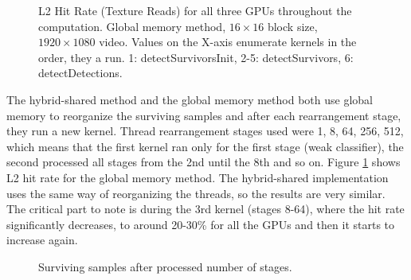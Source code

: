 \begin{figure}[h]
\centering{}
	\caption{L2 Hit Rate (Texture Reads) for all three GPUs throughout the computation. Global memory method, $16 \times 16$ block size, $1920 \times 1080$ video. Values on the X-axis enumerate kernels in the order, they a run. 1: detectSurvivorsInit, 2-5: detectSurvivors, 6: detectDetections.}
	\label{fig:l2-hit-rate-global}
\end{figure}

The hybrid-shared method and the global memory method both use global memory to reorganize the surviving samples and after each rearrangement stage, they run a new kernel. Thread rearrangement stages used were 1, 8, 64, 256, 512, which means that the first kernel ran only for the first stage (weak classifier), the second processed all stages from the 2nd until the 8th and so on. Figure \ref{fig:l2-hit-rate-global} shows L2 hit rate for the global memory method. The hybrid-shared implementation uses the same way of reorganizing the threads, so the results are very similar. The critical part to note is during the 3rd kernel (stages 8-64), where the hit rate significantly decreases, to around 20-30\% for all the GPUs and then it starts to increase again.

\begin{figure}[h]
\centering{}
	\caption{Surviving samples after processed number of stages.}
	\label{fig:survivor-count}
\end{figure}


